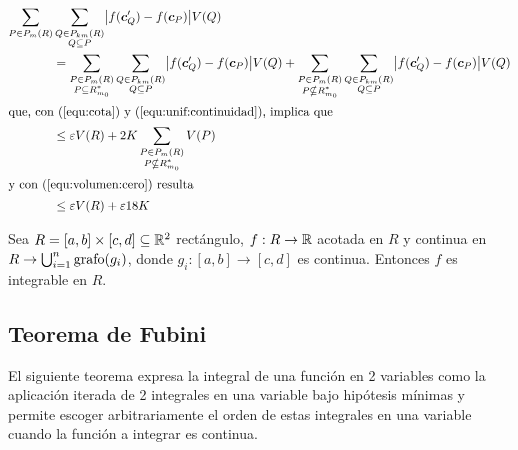 \begin{demostracion}
\begin{align*}
    \sum_{P \in \ep{m}{R}} &\sum_{\substack{Q \in \ep{km}{R} \\ Q \subseteq P}}
        \bigabs{ f(\vec{c}'_Q)-f(\vec{c}_P) } V(Q) \\
    &= \sum_{\substack{P \in \ep{m}{R} \\ P \subseteq R_{m_0}^*}}
        \sum_{\substack{Q \in \ep{km}{R} \\ Q \subseteq P}}
        \bigabs{ f(\vec{c}'_Q)-f(\vec{c}_P) } V(Q) + \sum_{\substack{P \in \ep{m}{R} \\ P \nsubseteq R_{m_0}^*}}
        \sum_{\substack{Q \in \ep{km}{R} \\ Q \subseteq P}}
        \bigabs{ f(\vec{c}'_Q)-f(\vec{c}_P) } V(Q) \\
\intertext{que, con (\ref{equ:cota}) y (\ref{equ:unif:continuidad}),
implica que}
    &\leq \varepsilon V(R) +
        2 K \sum_{\substack{P \in \ep{m}{R} \\ P \nsubseteq R_{m_0}^*}}
        V(P) \\
\intertext{y con (\ref{equ:volumen:cero}) resulta}
    &\leq \varepsilon V(R) + \varepsilon 18K %
\end{align*}
\end{demostracion}

\begin{corolario}
Sea $ R = [a,b] \times [c,d] \subseteq \mathbb{R}^2 $ rect\'angulo, $ f:R
\to \mathbb{R} $ acotada en $ R $ y continua en $ R \rightarrow
\bigcup_{i=1}^n\operatorname{grafo}(g_i) $, donde $ g_i: [a,b] \to [c,d] $ es
continua. Entonces $ f $ es integrable en $ R $.
\end{corolario}

\subsection{Teorema de Fubini}

El siguiente teorema expresa la integral de una funci\'on en 2 variables como la aplicaci\'on iterada de 2 integrales en una variable bajo hip\'otesis m\'inimas y permite escoger arbitrariamente el orden de estas integrales en una variable cuando la funci\'on a integrar es continua.

